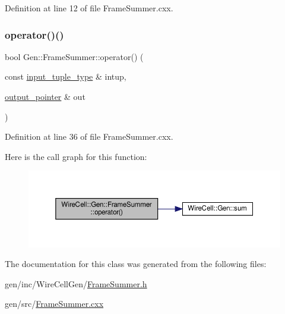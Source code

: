 Definition at line 12 of file Frame\+Summer.\+cxx.

\mbox{\label{class_wire_cell_1_1_gen_1_1_frame_summer_a5ea8e6a5a87afdf6b9bff3012c93d2df}} 
\subsubsection{\texorpdfstring{operator()()}{operator()()}}
{\footnotesize\ttfamily bool Gen\+::\+Frame\+Summer\+::operator() (\begin{DoxyParamCaption}\item[{const \hyperlink{class_wire_cell_1_1_i_join_node_ae9ca74a75f29555ad20944d585f3b232}{input\+\_\+tuple\+\_\+type} \&}]{intup,  }\item[{\hyperlink{class_wire_cell_1_1_i_join_node_a7af33cc87415e15f0e7db2b083f3def7}{output\+\_\+pointer} \&}]{out }\end{DoxyParamCaption})\hspace{0.3cm}{\ttfamily [virtual]}}



Definition at line 36 of file Frame\+Summer.\+cxx.

Here is the call graph for this function\+:
\nopagebreak
\begin{figure}[H]
\begin{center}
\leavevmode
\includegraphics[width=350pt]{class_wire_cell_1_1_gen_1_1_frame_summer_a5ea8e6a5a87afdf6b9bff3012c93d2df_cgraph}
\end{center}
\end{figure}


The documentation for this class was generated from the following files\+:\begin{DoxyCompactItemize}
\item 
gen/inc/\+Wire\+Cell\+Gen/\hyperlink{_frame_summer_8h}{Frame\+Summer.\+h}\item 
gen/src/\hyperlink{_frame_summer_8cxx}{Frame\+Summer.\+cxx}\end{DoxyCompactItemize}
